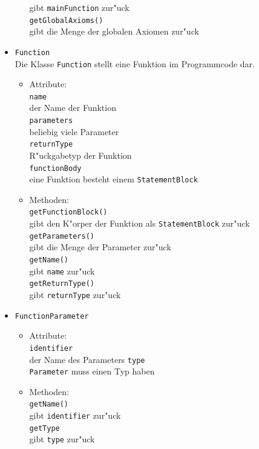 \documentclass[10pt,a4paper,titlepage]{article}
\begin{document}
\begin{itemize}
\begin{itemize}
gibt \texttt{mainFunction} zur"uck \\
\texttt{getGlobalAxioms()} \\
gibt die Menge der globalen Axiomen zur"uck
\end{itemize}
\item \texttt{Function} \\
Die Klasse \texttt{Function} stellt eine Funktion im Programmcode dar. 
\begin{itemize}
\item Attribute: \\
\texttt{name} \\
der Name der Funktion \\
\texttt{parameters} \\
beliebig viele Parameter \\
\texttt{returnType} \\
R"uckgabetyp der Funktion \\
\texttt{functionBody} \\
eine Funktion besteht einem \texttt{StatementBlock} \\
\item Methoden: \\
\texttt{getFunctionBlock()} \\
gibt den K"orper der Funktion als \texttt{StatementBlock} zur"uck \\
\texttt{getParameters()} \\
gibt die Menge der Parameter zur"uck \\
\texttt{getName()} \\
gibt \texttt{name} zur"uck \\
\texttt{getReturnType()} \\
gibt \texttt{returnType} zur"uck 
\end{itemize}
\item \texttt{FunctionParameter}
\begin{itemize}
\item Attribute: \\
\texttt{identifier} \\
der Name des Parameters 
\texttt{type} \\
\texttt{Parameter} muss einen Typ haben
\item Methoden: \\
\texttt{getName()} \\
gibt \texttt{identifier} zur"uck \\
\texttt{getType} \\
gibt \texttt{type} zur"uck
\end{itemize}

\end{itemize}
\end{document}
